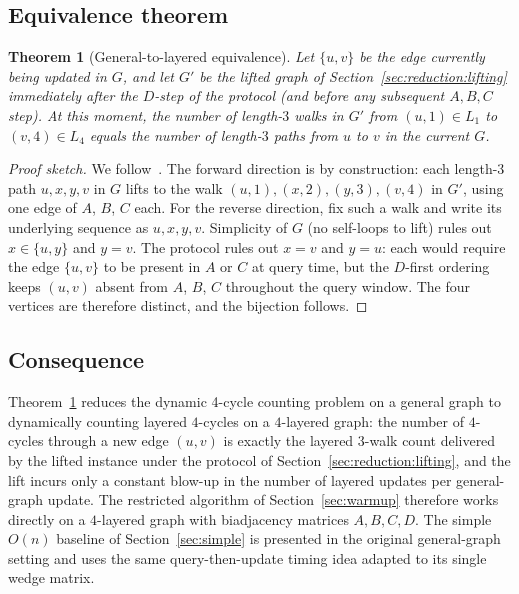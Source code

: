 \documentclass[sigconf,nonacm]{acmart}
\theoremstyle{plain}
\newtheorem{theorem}{Theorem}
\theoremstyle{definition}
\begin{document}
\subsection{Equivalence theorem}
\label{sec:reduction:theorem}

\begin{theorem}[General-to-layered equivalence]
\label{thm:lifting}
Let $\{u, v\}$ be the edge currently being updated in $G$, and let $G'$ be the lifted graph of Section~\ref{sec:reduction:lifting} immediately after the $D$-step of the protocol (and before any subsequent $A, B, C$ step). At this moment, the number of length-$3$ \emph{walks} in $G'$ from $(u, 1) \in L_1$ to $(v, 4) \in L_4$ equals the number of length-$3$ paths from $u$ to $v$ in the current $G$.
\end{theorem}

\begin{proof}[Proof sketch]
We follow~\cite{AssadiShah25}. The forward direction is by
construction: each length-$3$ path $u, x, y, v$ in $G$ lifts to the
walk $(u,1), (x,2), (y,3), (v,4)$ in $G'$, using one edge of $A$,
$B$, $C$ each. For the reverse direction, fix such a walk and write
its underlying sequence as $u, x, y, v$. Simplicity of $G$ (no
self-loops to lift) rules out $x \in \{u, y\}$ and $y = v$. The
protocol rules out $x = v$ and $y = u$: each would require the edge
$\{u, v\}$ to be present in $A$ or $C$ at query time, but the
$D$-first ordering keeps $(u, v)$ absent from $A$, $B$, $C$
throughout the query window. The four vertices are therefore
distinct, and the bijection follows.
\end{proof}

\subsection{Consequence}
\label{sec:reduction:consequence}
Theorem~\ref{thm:lifting} reduces the dynamic 4-cycle counting
problem on a general graph to dynamically counting layered
$4$-cycles on a $4$-layered graph: the number of $4$-cycles
through a new edge $(u, v)$ is exactly the layered $3$-walk count
delivered by the lifted instance under the protocol of
Section~\ref{sec:reduction:lifting}, and the lift incurs only a
constant blow-up in the number of layered updates per
general-graph update. The restricted algorithm of
Section~\ref{sec:warmup} therefore works directly on a $4$-layered
graph with biadjacency matrices $A, B, C, D$. The simple $O(n)$
baseline of Section~\ref{sec:simple} is presented in the original
general-graph setting and uses the same query-then-update timing
idea adapted to its single wedge matrix.
\end{document}
